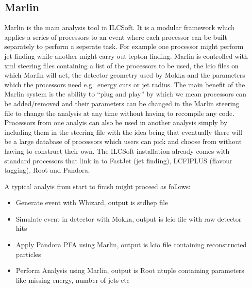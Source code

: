 \subsection{Marlin}
Marlin is the main analysis tool in ILCSoft. It is a modular framework which applies a series of processors to an event where each processor can be built separately to perform a seperate task. For example one processor might perform jet finding while another might carry out lepton finding. Marlin is controlled with xml steering files containing a list of the processors to be used, the lcio files on which Marlin will act, the detector geometry used by Mokka and the parameters which the processors need e.g.\ energy cuts or jet radius. The main benefit of the Marlin system is the ability to ``plug and play'' by which we mean processors can be added/removed and their parameters can be changed in the Marlin steering file to change the analysis at any time without having to recompile any code. Processors from one analyis can also be used in another analysis simply by including them in the steering file with the idea being that eventually there will be a large database of processors which users can pick and choose from without having to construct their own. The ILCSoft installation already comes with standard processors that link in to FastJet (jet finding), LCFIPLUS (flavour tagging), Root and Pandora.

A typical analyis from start to finish might proceed as follows:
\begin{itemize}
\item Generate event with Whizard, output is stdhep file
\item Simulate event in detector with Mokka, output is lcio file with raw detector hits
\item Apply Pandora PFA using Marlin, output is lcio file containing reconstructed particles
\item Perform Analysis using Marlin, output is Root ntuple containing parameters like missing energy, number of jets etc 
\end{itemize}



